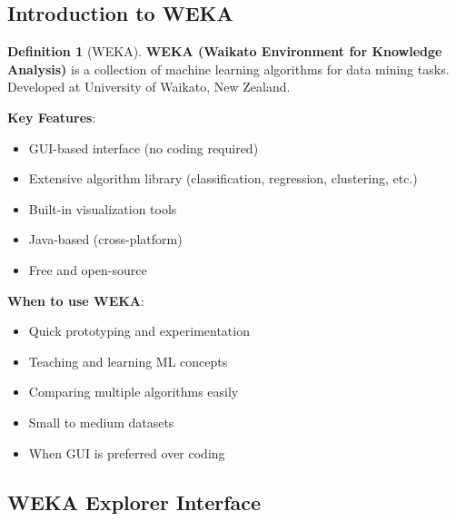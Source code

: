 \documentclass[11pt,twoside]{article}
\numberwithin{equation}{section}
\theoremstyle{plain}
\theoremstyle{definition}
\newtheorem{definition}[theorem]{Definition}
\theoremstyle{remark}
\begin{document}
\subsection{Introduction to WEKA}

\begin{definition}[WEKA]
\textbf{WEKA (Waikato Environment for Knowledge Analysis)} is a collection of machine learning algorithms for data mining tasks. Developed at University of Waikato, New Zealand.

\textbf{Key Features}:
\begin{itemize}
\item GUI-based interface (no coding required)
\item Extensive algorithm library (classification, regression, clustering, etc.)
\item Built-in visualization tools
\item Java-based (cross-platform)
\item Free and open-source
\end{itemize}

\textbf{When to use WEKA}:
\begin{itemize}
\item Quick prototyping and experimentation
\item Teaching and learning ML concepts
\item Comparing multiple algorithms easily
\item Small to medium datasets
\item When GUI is preferred over coding
\end{itemize}
\end{definition}

\subsection{WEKA Explorer Interface}
\end{document}

